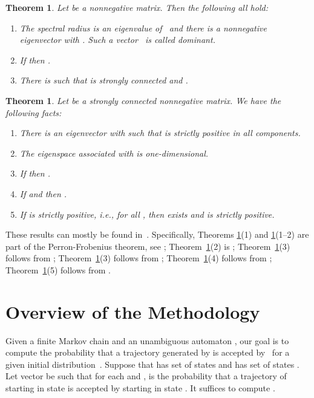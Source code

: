 \documentclass{elsarticle}
\newtheorem{theorem}[definition]{Theorem}
\begin{document}
\begin{theorem}
  Let  be a nonnegative matrix.  Then
  the following all hold:
\begin{enumerate}
\item The spectral radius  is an eigenvalue of~ and there
  is a nonnegative eigenvector  with
  .
  Such a vector~ is called \emph{dominant}.
\item If  then .
\item There is  such that  is strongly connected and .
\end{enumerate}
\label{thm:nonnegative}
\end{theorem}

\begin{theorem}
  Let  be a strongly connected nonnegative
  matrix.  We have the following facts:
\begin{enumerate}
\item There is an eigenvector  with
   such that  is
  strictly positive in all components.
\item The eigenspace associated with  is one-dimensional.
\item If  then .
\item If  and  
then .
\item If  is strictly positive, i.e.,  for all , then  exists and is strictly positive.
\end{enumerate}
\label{thm:irreducible}
\end{theorem}

These results can mostly be found in~\cite[Chapter 2]{book:BermanP94}.
Specifically, Theorems \ref{thm:nonnegative}(1) and \ref{thm:irreducible}(1--2) are part of the Perron-Frobenius theorem, see \cite[Theorems 2.1.1, 2.1.4]{book:BermanP94};
Theorem~\ref{thm:nonnegative}(2) is \cite[Corollary 2.1.6(a)]{book:BermanP94};
Theorem~\ref{thm:nonnegative}(3) follows from \cite[Corollary 2.1.6(b)]{book:BermanP94};
Theorem~\ref{thm:irreducible}(3) follows from \cite[Corollary 2.1.6]{book:BermanP94};
Theorem~\ref{thm:irreducible}(4) follows from \cite[Corollary 2.1.11]{book:BermanP94};
Theorem~\ref{thm:irreducible}(5) follows from \cite[Theorem 8.2.7]{HornJohnson13}.


\section{Overview of the Methodology} \label{sec:overview}

Given a finite Markov chain  and an unambiguous automaton ,
our goal is to compute the probability that a trajectory
generated by  is accepted by~ for a given initial distribution~.  Suppose that  has set
of states  and  has set of states .  Let vector
 be such that for each 
and ,  is the probability that a trajectory
of  starting in state  is accepted by  starting in state
.  It suffices to compute .
\end{document}
